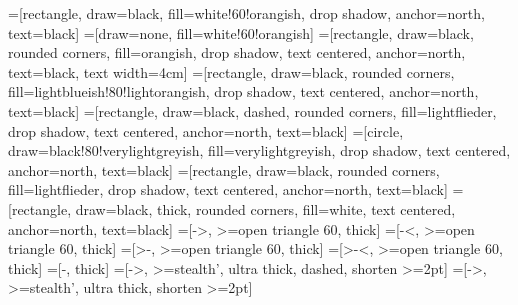 =[rectangle,%
                    draw=black,%
                     fill=white!60!orangish,%
                     drop shadow,%
                     anchor=north,%
                     text=black]
=[draw=none,%
                      fill=white!60!orangish]%
=[rectangle,%
                    draw=black,%
                    rounded corners,%
                    fill=orangish,%
                    drop shadow,%
                    text centered,%
                    anchor=north,%
                    text=black,%
                    text width=4cm]
=[rectangle,%
                    draw=black,%
                    rounded corners,%
                    fill=lightblueish!80!lightorangish,
                    drop shadow,%
                    text centered,%
                    anchor=north,%
                    text=black]%
=[rectangle,%
                    draw=black,%
                    dashed,%
                    rounded corners,%
                    fill=lightflieder,
                    drop shadow,%
                    text centered,%
                    anchor=north,%
                    text=black]%
=[circle,%
                    draw=black!80!verylightgreyish,%
                    fill=verylightgreyish,%
                    drop shadow,%
                    text centered,%
                    anchor=north,%
                    text=black]
=[rectangle,%
                     draw=black,%
                     rounded corners,%
                     fill=lightflieder,%
                     drop shadow,%
                     text centered,%
                     anchor=north,%
                     text=black]
=[rectangle,%
                     draw=black,%
                     thick,
                     rounded corners,%
                     fill=white,%
                     text centered,%
                     anchor=north,
                     text=black]
=[->, >=open triangle 60, thick]
=[-<, >=open triangle 60, thick]
=[>-, >=open triangle 60, thick]
=[>-<, >=open triangle 60, thick]
=[-, thick]
=[->, >=stealth', ultra thick, dashed, shorten >=2pt]
=[->, >=stealth', ultra thick, shorten >=2pt]



